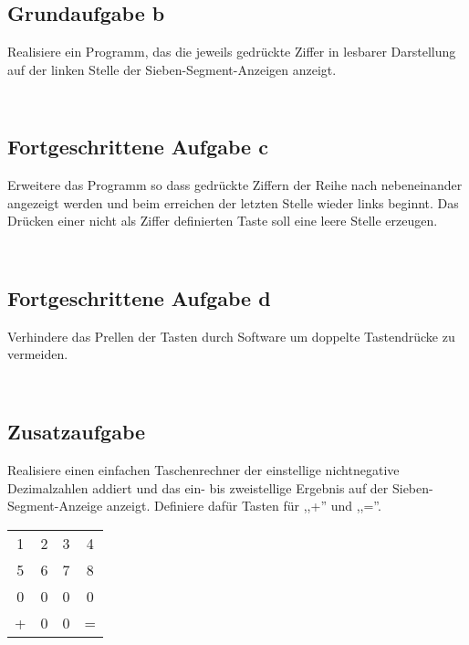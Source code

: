 \documentclass[a4paper,12pt,titlepage]{scrartcl}
\begin{document}
\subsection*{Grundaufgabe b}
Realisiere ein Programm, das die jeweils gedrückte Ziffer in lesbarer Darstellung auf der linken Stelle der Sieben-Segment-Anzeigen anzeigt. 
\begin{lstlisting}[caption= mainB]
    
\end{lstlisting}


\subsection*{Fortgeschrittene Aufgabe c}
Erweitere das Programm so dass gedrückte Ziffern der Reihe nach nebeneinander angezeigt werden und beim erreichen der letzten Stelle wieder links beginnt. 
Das Drücken einer nicht als Ziffer definierten Taste soll eine leere Stelle erzeugen.
\begin{lstlisting}[caption= mainC]
    
\end{lstlisting}


\subsection*{Fortgeschrittene Aufgabe d}
Verhindere das Prellen der Tasten durch Software um doppelte Tastendrücke zu vermeiden. 
\begin{lstlisting}[caption= mainD]
    
\end{lstlisting}

\subsection*{Zusatzaufgabe}
Realisiere einen einfachen Taschenrechner der einstellige nichtnegative Dezimalzahlen addiert und das ein- bis zweistellige Ergebnis auf der Sieben-Segment-Anzeige anzeigt. 
Definiere dafür Tasten für ,,+'' und ,,=''. 
\begin{tabular}{c|c|c|c}
    1 & 2 & 3 & 4\\
    5 & 6 & 7 & 8\\
    0 & 0 & 0 & 0\\
    + & 0 & 0 & = 
\end{tabular}

\begin{lstlisting}[caption= addition]
    
\end{lstlisting}
\end{document}
